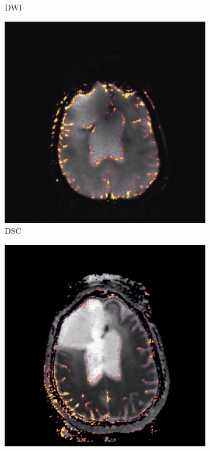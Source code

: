 \begin{figure}[htbp]
\begin{subfigure}[t]{\figexamplewidth}
        \caption{\gls{DWI}}\label{fig:DWICam}
    \end{subfigure}
    \begin{subfigure}[t]{\figexamplewidth}
        \centering
        \includegraphics[trim={0.5cm 0cm 0.5cm 1cm}, clip,width=\textwidth]{Figures/DSC_saliency}
        \caption{\gls{DSC}}\label{fig:PWICam}
    \end{subfigure}
    \begin{subfigure}[t]{\figexamplewidth}
        \centering
        \includegraphics[trim={0.5cm 0cm 0.5cm 1cm}, clip, width=\textwidth]{Figures/DERIVED_saliency}

\end{subfigure}
\end{figure}
